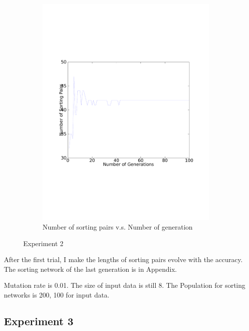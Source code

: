 \documentclass[11pt]{article}
\begin{document}
\begin{figure}[h!]
\begin{subfigure}[b]{0.49\textwidth}
	\includegraphics[width=\textwidth]{2_2.pdf}
	\caption{Number of sorting pairs v.s. Number of generation}
\end{subfigure}
\caption{Experiment 2}
\end{figure}

After the first trial, I make the lengths of sorting pairs evolve with
the accuracy. The sorting network of the last generation is in
Appendix.

Mutation rate is 0.01.
The size of input data is still 8. The Population for sorting networks
is 200, 100 for input data.

\subsection{Experiment 3}
\end{document}
